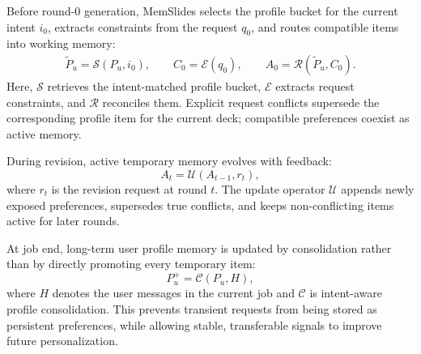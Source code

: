 \documentclass{llmxive}
\providecommand{\methodname}{MemSlides\xspace}
\begin{document}
Before round-0 generation, \methodname selects the profile bucket for the
current intent $i_0$, extracts constraints from the request $q_0$, and routes
compatible items into working memory:
\begin{equation}
\label{eq:profile_routing}
\begin{aligned}
\tilde P_u = \mathcal{S}\!\left(P_u, i_0\right),
\qquad
C_0 = \mathcal{E}\!\left(q_0\right),
\qquad
A_0 = \mathcal{R}\!\left(\tilde P_u, C_0\right).
\end{aligned}
\end{equation}
Here, $\mathcal{S}$ retrieves the intent-matched profile bucket, $\mathcal{E}$
extracts request constraints, and $\mathcal{R}$ reconciles them. Explicit
request conflicts supersede the corresponding profile item for the current deck;
compatible preferences coexist as active memory.

During revision, active temporary memory evolves with feedback:
\begin{equation}
\label{eq:working_memory_update}
A_t = \mathcal{U}\!\left(A_{t-1}, r_t\right),
\end{equation}
where $r_t$ is the revision request at round $t$. The update operator
$\mathcal{U}$ appends newly exposed preferences, supersedes true conflicts, and
keeps non-conflicting items active for later rounds.

At job end, long-term user profile memory is updated by consolidation rather
than by directly promoting every temporary item:
\begin{equation}
\label{eq:profile_consolidation}
P_u^{+} = \mathcal{C}\!\left(P_u, H\right),
\end{equation}
where $H$ denotes the user messages in the current job and $\mathcal{C}$ is
intent-aware profile consolidation.
This prevents transient requests from being stored as persistent preferences, while allowing stable, transferable signals to improve future personalization.
\end{document}
